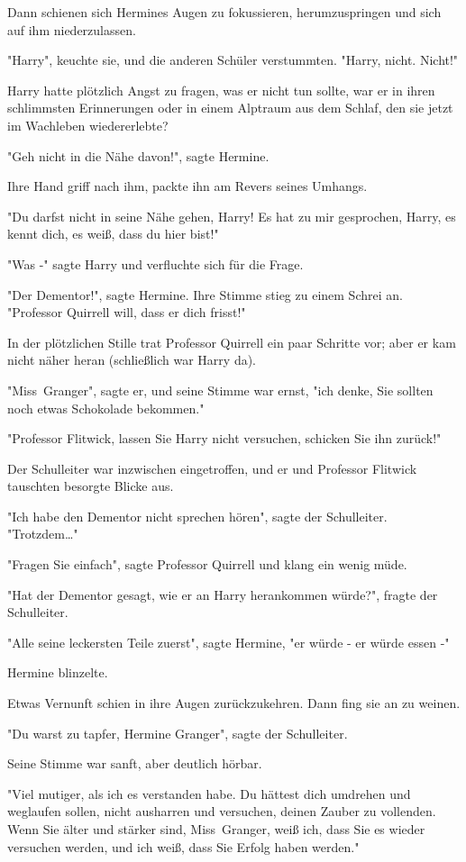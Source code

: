 {Dann schienen sich Hermines Augen zu fokussieren, herumzuspringen und sich auf ihm niederzulassen.

"Harry", keuchte sie, und die anderen Schüler verstummten. "Harry, nicht. Nicht!"

Harry hatte plötzlich Angst zu fragen, was er nicht tun sollte, war er in ihren schlimmsten Erinnerungen oder in einem Alptraum aus dem Schlaf, den sie jetzt im Wachleben wiedererlebte?

"Geh nicht in die Nähe davon!", sagte Hermine.

Ihre Hand griff nach ihm, packte ihn am Revers seines Umhangs.

"Du darfst nicht in seine Nähe gehen, Harry! Es hat zu mir gesprochen, Harry, es kennt dich, es weiß, dass du hier bist!"

"Was -" sagte Harry und verfluchte sich für die Frage.

"Der Dementor!", sagte Hermine. Ihre Stimme stieg zu einem Schrei an. "Professor Quirrell will, dass er dich frisst!"

In der plötzlichen Stille trat Professor Quirrell ein paar Schritte vor; aber er kam nicht näher heran (schließlich war Harry da).

"Miss~Granger", sagte er, und seine Stimme war ernst, "ich denke, Sie sollten noch etwas Schokolade bekommen."

"Professor Flitwick, lassen Sie Harry nicht versuchen, schicken Sie ihn zurück!"

Der Schulleiter war inzwischen eingetroffen, und er und Professor Flitwick tauschten besorgte Blicke aus.

"Ich habe den Dementor nicht sprechen hören", sagte der Schulleiter. "Trotzdem…"

"Fragen Sie einfach", sagte Professor Quirrell und klang ein wenig müde.

"Hat der Dementor gesagt, wie er an Harry herankommen würde?", fragte der Schulleiter.

"Alle seine leckersten Teile zuerst", sagte Hermine, "er würde - er würde essen -"

Hermine blinzelte.

Etwas Vernunft schien in ihre Augen zurückzukehren. Dann fing sie an zu weinen.

"Du warst zu tapfer, Hermine Granger", sagte der Schulleiter.

Seine Stimme war sanft, aber deutlich hörbar.

"Viel mutiger, als ich es verstanden habe. Du hättest dich umdrehen und weglaufen sollen, nicht ausharren und versuchen, deinen Zauber zu vollenden. Wenn Sie älter und stärker sind, Miss~Granger, weiß ich, dass Sie es wieder versuchen werden, und ich weiß, dass Sie Erfolg haben werden."

}
